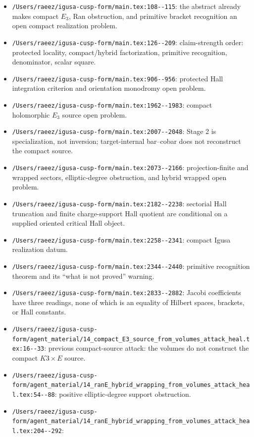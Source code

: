 \begin{itemize}
\item \verb|/Users/raeez/igusa-cusp-form/main.tex:108--115|:
the abstract already makes compact \(E_3\), Ran obstruction, and primitive
bracket recognition an open compact realization problem.
\item \verb|/Users/raeez/igusa-cusp-form/main.tex:126--209|:
claim-strength order: protected locality, compact/hybrid factorization,
primitive recognition, denominator, scalar square.
\item \verb|/Users/raeez/igusa-cusp-form/main.tex:906--956|:
protected Hall integration criterion and orientation monodromy open
problem.
\item \verb|/Users/raeez/igusa-cusp-form/main.tex:1962--1983|:
compact holomorphic \(E_3\) source open problem.
\item \verb|/Users/raeez/igusa-cusp-form/main.tex:2007--2048|:
Stage 2 is specialization, not inversion; target-internal bar--cobar does
not reconstruct the compact source.
\item \verb|/Users/raeez/igusa-cusp-form/main.tex:2073--2166|:
projection-finite and wrapped sectors, elliptic-degree obstruction, and
hybrid wrapped open problem.
\item \verb|/Users/raeez/igusa-cusp-form/main.tex:2182--2238|:
sectorial Hall truncation and finite charge-support Hall quotient are conditional on a
supplied oriented critical Hall object.
\item \verb|/Users/raeez/igusa-cusp-form/main.tex:2258--2341|:
compact Igusa realization datum.
\item \verb|/Users/raeez/igusa-cusp-form/main.tex:2344--2440|:
primitive recognition theorem and its ``what is not proved'' warning.
\item \verb|/Users/raeez/igusa-cusp-form/main.tex:2833--2882|:
Jacobi coefficients have three readings, none of which is an equality of
Hilbert spaces, brackets, or Hall constants.
\item \verb|/Users/raeez/igusa-cusp-form/agent_material/14_compact_E3_source_from_volumes_attack_heal.tex:16--33|:
previous compact-source attack: the volumes do not construct the compact
\(K3\times E\) source.
\item \verb|/Users/raeez/igusa-cusp-form/agent_material/14_ranE_hybrid_wrapping_from_volumes_attack_heal.tex:54--88|:
positive elliptic-degree support obstruction.
\item \verb|/Users/raeez/igusa-cusp-form/agent_material/14_ranE_hybrid_wrapping_from_volumes_attack_heal.tex:204--292|:

\end{itemize}
